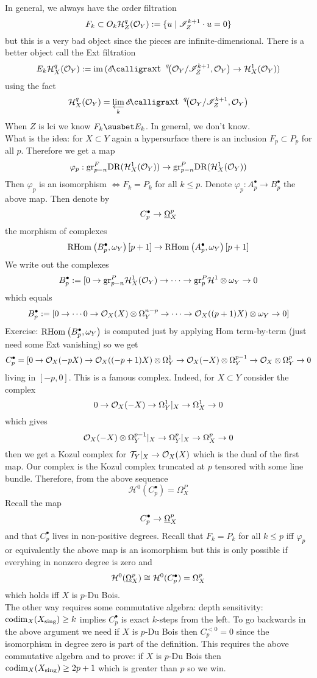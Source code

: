 \documentclass[12pt]{article}
\renewcommand{\gr}{\mathrm{gr}}
\renewcommand{\cH}{\mathcal{H}}
\renewcommand{\codim}{\mathrm{codim}}
\begin{document}
In general, we always have the order filtration
\[ F_k \subset O_k \cH_Z^q(\struct{Y}) := \{ u \mid \I_Z^{k+1} \cdot u = 0 \} \]
but this is a very bad object since the pieces are infinite-dimensional. There is a better object call the Ext filtration
\[ E_k \cH^q_X(\struct{Y}) := \im{(\shExt{q}{}{\struct{Y}/\I_Z^{k+1}}{\struct{Y}} \to \cH^1_X(\struct{Y}))} \]
using the fact
\[ \cH^q_X(\struct{Y}) = \ilim_k \shExt{q}{}{\struct{Y}/\I_Z^{k+1}}{\struct{Y}} \]
When $Z$ is lci we know $F_k \susbet E_k$. In general, we don't know. 
\bigskip\\
What is the idea: for $X \subset Y$ again a hypersurface there is an inclusion $F_p \subset P_p$ for all $p$. Therefore we get a map
\[ \varphi_p : \gr^F_{p-n} \DR(\cH^1_X(\struct{Y})) \to \gr^P_{p-n} \DR(\cH^1_X(\struct{Y})) \]
Then $\varphi_p$ is an isomorphism $\iff F_k = P_k$ for all $k \le p$. Denote $\varphi_p : A_p^\bullet \to B_p^\bullet$ the above map. Then denote by
\[ C_p^\bullet \to \underline{\Omega}_X^p \]
the morphism of complexes
\[ \mathrm{RHom}_{} \left( B_p^\bullet, \omega_Y \right)[p+1] \to \mathrm{RHom}_{} \left( A_p^\bullet, \omega_Y \right)[p+1] \]
We write out the complexes
\[ B_p^\bullet := [0 \to \gr^P_{p-n} \cH^1_X(\struct{Y}) \to \cdots \to \gr_p^P \cH^1 \ot \omega_Y \to 0 \]
which equals
\[ B_p^\bullet := [0 \to \cdots 0 \to \mathcal{O}_{X}(X) \otimes \Omega_Y^{n-p} \to \cdots \to \mathcal{O}_{X}((p+1)X) \otimes \omega_Y \to 0] \]
Exercise: $\mathrm{RHom}_{} \left( B_p^\bullet, \omega_Y \right)$ is computed just by applying Hom term-by-term (just need some Ext vanishing) so we get
\[ C_p^\bullet = [0 \to \mathcal{O}_{X}(-pX) \to \mathcal{O}_{X}((-p+1)X) \otimes \Omega^1_Y \to \mathcal{O}_{X}(-X) \otimes \Omega_Y^{p-1} \to \mathcal{O}_{X} \otimes \Omega_Y^{p} \to 0 \]
living in $[-p, 0]$.
This is a famous complex. Indeed, for $X \subset Y$ consider the complex
\[ 0 \to \mathcal{O}_{X}(-X) \to \Omega_Y^1|_X \to \Omega_X^1 \to 0 \]
which gives
\[ \mathcal{O}_{X}(-X) \otimes \Omega_Y^{p-1}|_X \to \Omega_Y^p|_X \to \Omega^p_X \to 0 \]
then we get a Kozul complex for $\mathcal{T}_Y|_X \to \mathcal{O}_{X}(X)$ which is the dual of the first map. Our complex is the Kozul complex truncated at $p$ tensored with some line bundle. Therefore, from the above sequence
\[ \cH^0(C_p^\bullet) = \Omega_X^P \]
Recall the map
\[ C_p^\bullet \to \underline{\Omega}_X^p \]
and that $C_p^\bullet$ lives in non-positive degrees. Recall that $F_k = P_k$ for all $k \le p$ iff $\varphi_p$ or equivalently the above map is an isomorphism but this is only possible if everyhing in nonzero degree is zero and 
\[ \cH^0(\ulO_X^p) \cong \cH^0(C_p^\bullet) = \Omega_X^p \]
which holds iff $X$ is $p$-Du Bois. 
\bigskip\\
The other way requires some commutative algebra: depth sensitivity: $\codim_X(X_{\sing}) \ge k$ implies $C_p^\bullet$ is exact $k$-steps from the left. To go backwards in the above argument we need if $X$ is $p$-Du Bois then $C_p^{<0} = 0$ since the isomorphism in degree zero is part of the definition. This requires the above commutative algebra and to prove: if $X$ is $p$-Du Bois then $\codim_X(X_{\sing}) \ge 2p + 1$ which is greater than $p$ so we win. 
\end{document}
